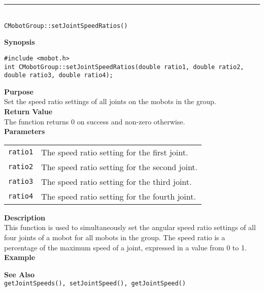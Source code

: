 \noindent
\vspace{5pt}
\rule{4.5in}{0.015in}\\
\noindent
{\LARGE \texttt{CMobotGroup::setJointSpeedRatios()}}\\
{}

\noindent
{\bf Synopsis}
\vspace{-8pt}
\begin{verbatim}
#include <mobot.h>
int CMobotGroup::setJointSpeedRatios(double ratio1, double ratio2, double ratio3, double ratio4);
\end{verbatim}

\noindent
{\bf Purpose}\\
Set the speed ratio settings of all joints on the mobots in the group.\\

\noindent
{\bf Return Value}\\
The function returns 0 on success and non-zero otherwise.\\

\noindent
{\bf Parameters}
\vspace{-0.1in}
\begin{description}
\item               
\begin{tabular}{p{10 mm}p{145 mm}}
\texttt{ratio1} & The speed ratio setting for the first joint. \\
\texttt{ratio2} & The speed ratio setting for the second joint. \\
\texttt{ratio3} & The speed ratio setting for the third joint. \\
\texttt{ratio4} & The speed ratio setting for the fourth joint. \\
\end{tabular}
\end{description}

\noindent
{\bf Description}\\
This function is used to simultaneously set the angular speed ratio settings of
all four joints of a mobot for all mobots in the group. The speed ratio is a percentage of the maximum
speed of a joint, expressed in a value from 0 to 1.\\

\noindent
{\bf Example}\\
\noindent

\noindent
{\bf See Also}\\
\texttt{getJointSpeeds(), setJointSpeed(), getJointSpeed()}

